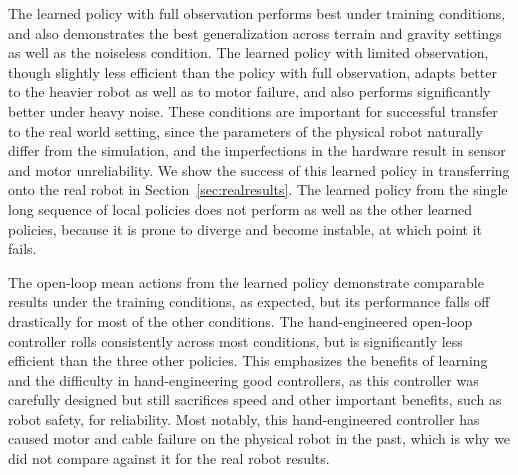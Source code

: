 
The learned policy with full observation performs best under training
conditions, and also demonstrates the best generalization across terrain and
gravity settings as well as the noiseless condition. The learned policy with
limited observation, though slightly less efficient than the policy with full
observation, adapts better to the heavier robot as well as to motor failure, and
also performs significantly better under heavy noise. These conditions are
important for successful transfer to the real world setting, since the
parameters of the physical \SB{} robot naturally differ from the simulation, and
the imperfections in the hardware result in sensor and motor unreliability. We
show the success of this learned policy in transferring onto the real robot in
Section~\ref{sec:realresults}. The learned policy from the single long sequence
of local policies does not perform as well as the other learned policies,
because it is prone to diverge and become instable, at which point it fails.

The open-loop mean actions from the learned policy demonstrate comparable
results under the training conditions, as expected, but its performance falls
off drastically for most of the other conditions. 
The hand-engineered
open-loop controller rolls consistently across most conditions, but is
significantly less efficient than the three other policies. This emphasizes the
benefits of learning and the difficulty in hand-engineering good controllers, as
this controller was carefully designed but still sacrifices speed and other
important benefits, such as robot safety, for reliability. Most notably, this
hand-engineered controller has caused motor and cable failure on the physical
\SB{} robot in the past, which is why we did not compare against it for the real
robot results.

